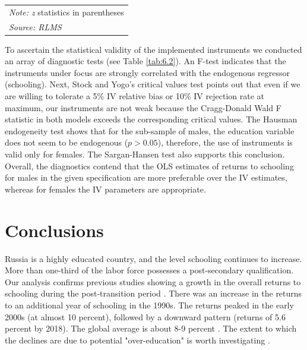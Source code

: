 \documentclass[alpha-refs]{wiley-article-01g}
\begin{document}
\begin{table}[h!]
\begin{tabular}{l*{2}{c}}
		\hline\hline
		\multicolumn{3}{l}{\footnotesize  \textit{Note: z} statistics in parentheses}\\
		\multicolumn{3}{l}{\footnotesize  \textit{Source: RLMS}}\\
	\end{tabular}
\end{table}

To ascertain the statistical validity of the implemented instruments we 
conducted an array of diagnostic tests (see Table \ref{tab:6.2}). An F-test 
indicates that the instruments under focus are strongly correlated with the 
endogenous regressor (schooling). Next,  Stock and Yogo's critical values 
test points out that even if we are willing to tolerate a 5\% IV relative 
bias or 10\% IV rejection rate at maximum, our instruments are not weak 
because the Cragg-Donald Wald F statistic in both models exceeds the 
corresponding critical values. The Hausman endogeneity test shows that for 
the sub-sample of males, the education variable does not seem to be 
endogenous ($p>0.05$), therefore, the use of instruments is valid only for 
females. The Sargan-Hansen test also supports this conclusion. Overall, the 
diagnostics contend that the OLS estimates of returns to schooling for 
males in the given specification are more preferable over the IV estimates, 
whereas for females the IV parameters are appropriate.

\section{Conclusions}

Russia is a highly educated country, and the level schooling continues to increase. More than one-third of the labor force possesses a post-secondary qualification. Our analysis confirms previous studies showing a growth in the overall returns to schooling during the post-transition period \parencite{Brainerd1998,Clark2003,Vernon2002}. There was an increase in the returns to an additional year of schooling in the 1990s. The returns peaked in the early 2000s (at almost 10 percent), followed by a downward pattern (returns of 5.6 percent by 2018). The global average is about 8-9 percent \parencite{Psacharopoulos_Patrinos2018}. The extent to which the declines are due to potential "over-education" is worth investigating \parencite{Gimpelson2019}.
\end{document}
